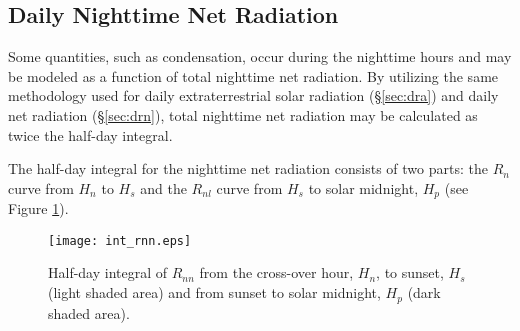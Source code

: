 \subsection{Daily Nighttime Net Radiation}
\label{sec:drnn}
Some quantities, such as condensation, occur during the nighttime hours and may be modeled as a function of total nighttime net radiation. 
By utilizing the same methodology used for daily extraterrestrial solar radiation (\S \ref{sec:dra}) and daily net radiation (\S \ref{sec:drn}), total nighttime net radiation may be calculated as twice the half-day integral.

The half-day integral for the nighttime net radiation consists of two parts: the $R_n$ curve from $H_n$ to $H_s$ and the $R_{nl}$ curve from $H_s$ to solar midnight, $H_p$ (see Figure \ref{fig:intrnn}).

\begin{figure}[ht!]
    \texttt{[image: int\_rnn.eps]}
    \caption{Half-day integral of $R_{nn}$ from the cross-over hour, $H_n$, to sunset, $H_s$ (light shaded area) and from sunset to solar midnight, $H_p$ (dark shaded area).}
    \label{fig:intrnn}
\end{figure}

